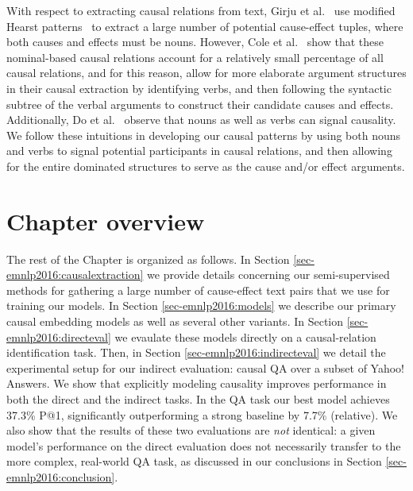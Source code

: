 With respect to extracting causal relations from text, Girju et al.~\citeyear{girju2002text} use modified Hearst patterns~\cite{hearst1992automatic} to extract a large number of potential cause-effect tuples, where both causes and effects must be nouns.
However, Cole et al.~\citeyear{cole2005lightweight} show that these nominal-based causal relations account for a relatively small percentage of all causal relations, and for this reason, \cite{yang2014multi} allow for more elaborate argument structures in their causal extraction by identifying verbs, and then following the syntactic subtree of the verbal arguments to construct their candidate causes and effects. 
Additionally, Do et al.~\citeyear{do2011minimally} observe that nouns as well as verbs can signal causality.  
We follow these intuitions in developing our causal patterns by using both nouns and verbs to signal potential participants in causal relations, and then allowing for the entire dominated structures to serve as the cause and/or effect arguments.

\section{Chapter overview}

The rest of the Chapter is organized as follows.  
In Section \ref{sec-emnlp2016:causalextraction} we provide details concerning our semi-supervised methods for gathering a large number of cause-effect text pairs that we use for training our models.  In Section \ref{sec-emnlp2016:models} we describe our primary causal embedding models as well as several other variants.  In Section \ref{sec-emnlp2016:directeval} we evaulate these models directly on a causal-relation identification task.  Then, in Section \ref{sec-emnlp2016:indirecteval} we detail the experimental setup for our indirect evaluation: causal QA over a subset of Yahoo! Answers.  We show that explicitly modeling causality improves performance in both the direct and the indirect tasks. In the QA task our best model achieves 37.3\% P@1, significantly outperforming a strong baseline by 7.7\% (relative).
We also show that the results of these two evaluations are \emph{not} identical: a given model's performance on the direct evaluation does not necessarily transfer to the more complex, real-world QA task, as discussed in our conclusions in Section \ref{sec-emnlp2016:conclusion}.


